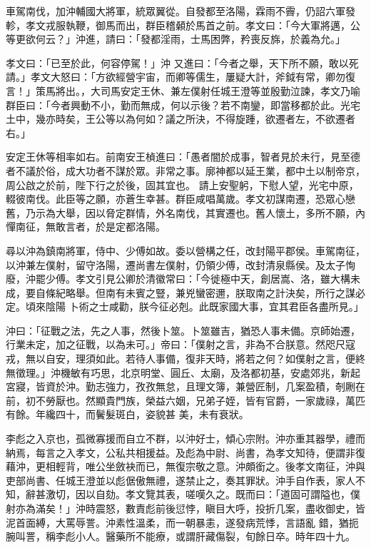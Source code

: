 \begin{pinyinscope}
 車駕南伐，加沖輔國大將軍，統眾翼從。自發都至洛陽，霖雨不霽，仍詔六軍發軫，孝文戎服執鞭，御馬而出，群臣稽顙於馬首之前。孝文曰：「今大軍將邁，公等更欲何云？」沖進，請曰：「發都淫雨，士馬困弊，矜喪反旆，於義為允。」



 孝文曰：「已至於此，何容停駕！」沖
 又進曰：「今者之舉，天下所不願，敢以死請。」孝文大怒曰：「方欲經營宇宙，而卿等儒生，屢疑大計，斧鉞有常，卿勿復言！」策馬將出。，大司馬安定王休、兼左僕射任城王澄等並殷勤泣諫，孝文乃喻群臣曰：「今者興動不小，勤而無成，何以示後？若不南鑾，即當移都於此。光宅土中，幾亦時矣，王公等以為何如？議之所決，不得旋踵，欲遷者左，不欲遷者右。」



 安定王休等相率如右。前南安王楨進曰：「愚者闇於成事，智者見於未行，見至德者不議於俗，成大功者不謀於眾。非常之事。廓神都以延王業，都中土以制帝京，周公啟之於前，陛下行之於後，固其宜也。
 請上安聖躬，下慰人望，光宅中原，輟彼南伐。此臣等之願，亦蒼生幸甚。群臣咸唱萬歲。孝文初謀南遷，恐眾心戀舊，乃示為大舉，因以脅定群情，外名南伐，其實遷也。舊人懷土，多所不願，內憚南征，無敢言者，於是定都洛陽。



 尋以沖為鎮南將軍，侍中、少傅如故。委以營構之任，改封陽平郡侯。車駕南征，以沖兼左僕射，留守洛陽，遷尚書左僕射，仍領少傅，改封清泉縣侯。及太子恂廢，沖罷少傅。孝文引見公卿於清徽常曰：「今徙極中天，創居嵩、洛，雖大構未成，要自條紀略舉。但南有未賓之豎，兼兇蠻密邇，朕取南之計決矣，所行之謀必定。頃來陰陽
 卜術之士咸勸，朕今征必剋。此既家國大事，宜其君臣各盡所見。」



 沖曰：「征戰之法，先之人事，然後卜筮。卜筮雖吉，猶恐人事未備。京師始遷，行業未定，加之征戰，以為未可。」帝曰：「僕射之言，非為不合朕意。然咫尺寇戎，無以自安，理須如此。若待人事備，復非天時，將若之何？如僕射之言，便終無徵理。」沖機敏有巧思，北京明堂、圓丘、太廟，及洛都初基，安處郊兆，新起宮寢，皆資於沖。勤志強力，孜孜無怠，且理文簿，兼營匠制，几案盈積，剞劂在前，初不勞厭也。然顯貴門族，榮益六姻，兄弟子姪，皆有官爵，一家歲祿，萬匹有餘。年纔四十，而鬢髮斑白，姿貌甚
 美，未有衰狀。



 李彪之入京也，孤微寡援而自立不群，以沖好士，傾心宗附。沖亦重其器學，禮而納焉，每言之入孝文，公私共相援益。及彪為中尉、尚書，為孝文知待，便謂非復藉沖，更相輕背，唯公坐斂袂而已，無復宗敬之意。沖頗銜之。後孝文南征，沖與吏部尚書、任城王澄並以彪倨傲無禮，遂禁止之，奏其罪狀。沖手自作表，家人不知，辭甚激切，因以自劾。孝文覽其表，嗟嘆久之。既而曰：「道固可謂隘也，僕射亦為滿矣！」沖時震怒，數責彪前後愆悖，瞋目大呼，投折几案，盡收御史，皆泥首面縛，大罵辱詈。沖素性溫柔，而一朝暴恚，遂發病荒悸，言語亂
 錯，猶扼腕叫詈，稱李彪小人。醫藥所不能療，或謂肝藏傷裂，旬餘日卒。時年四十九。




\end{pinyinscope}
